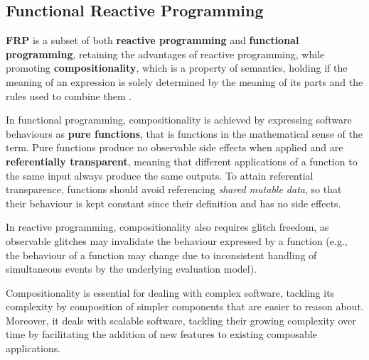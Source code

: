 
\subsection{Functional Reactive Programming}
\label{section:background:concepts:frp}

\textbf{\ac{FRP}} is a subset of both \textbf{reactive programming} and
\textbf{functional programming}, retaining the advantages of reactive
programming, while promoting \textbf{compositionality}, which is a
property of semantics, holding if the meaning of an expression is solely
determined by the meaning of its parts and the rules used to combine them
\cite{FRP}.

In functional programming, compositionality is achieved by expressing software
behaviours as \textbf{pure functions}, that is functions in the mathematical
sense of the term. Pure functions produce no observable side effects when
applied and are \textbf{referentially transparent}, meaning that different
applications of a function to the same input always produce the same outputs.
To attain referential transparence, functions should avoid referencing
\textit{shared mutable data}, so that their behaviour is kept constant since
their definition and has no side effects.

In reactive programming, compositionality also requires glitch freedom, as
observable glitches may invalidate the behaviour expressed by a function (e.g.,
the behaviour of a function may change due to inconsistent handling of
simultaneous events by the underlying evaluation model).

Compositionality is essential for dealing with complex software, tackling its
complexity by composition of simpler components that are easier to reason
about. Moreover, it deals with scalable software, tackling their growing
complexity over time by facilitating the addition of new features to existing
composable applications.
